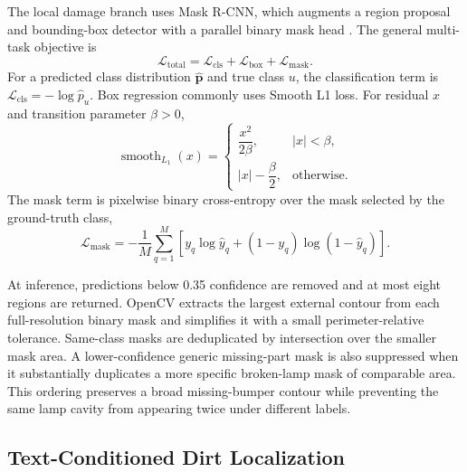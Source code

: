 \documentclass[conference]{IEEEtran}
\begin{document}
The local damage branch uses Mask R-CNN, which augments a region proposal and bounding-box detector with a parallel binary mask head \cite{he2017mask}. The general multi-task objective is
\begin{equation}
    \mathcal{L}_{\mathrm{total}} =
    \mathcal{L}_{\mathrm{cls}}+
    \mathcal{L}_{\mathrm{box}}+
    \mathcal{L}_{\mathrm{mask}}.
    \label{eq:multitask}
\end{equation}
For a predicted class distribution $\hat{\mathbf{p}}$ and true class $u$, the classification term is $\mathcal{L}_{\mathrm{cls}}=-\log \hat{p}_{u}$. Box regression commonly uses Smooth L1 loss. For residual $x$ and transition parameter $\beta>0$,
\begin{equation}
\operatorname{smooth}_{L_1}(x)=
\begin{cases}
\dfrac{x^2}{2\beta}, & |x|<\beta,\\[4pt]
|x|-\dfrac{\beta}{2}, & \text{otherwise}.
\end{cases}
\label{eq:smoothl1}
\end{equation}
The mask term is pixelwise binary cross-entropy over the mask selected by the ground-truth class,
\begin{equation}
    \mathcal{L}_{\mathrm{mask}}=-\frac{1}{M}
    \sum_{q=1}^{M}\left[y_q\log \hat{y}_q+
    (1-y_q)\log(1-\hat{y}_q)\right].
    \label{eq:maskloss}
\end{equation}

At inference, predictions below 0.35 confidence are removed and at most eight regions are returned. OpenCV extracts the largest external contour from each full-resolution binary mask and simplifies it with a small perimeter-relative tolerance. Same-class masks are deduplicated by intersection over the smaller mask area. A lower-confidence generic missing-part mask is also suppressed when it substantially duplicates a more specific broken-lamp mask of comparable area. This ordering preserves a broad missing-bumper contour while preventing the same lamp cavity from appearing twice under different labels.

\subsection{Text-Conditioned Dirt Localization}
\end{document}
